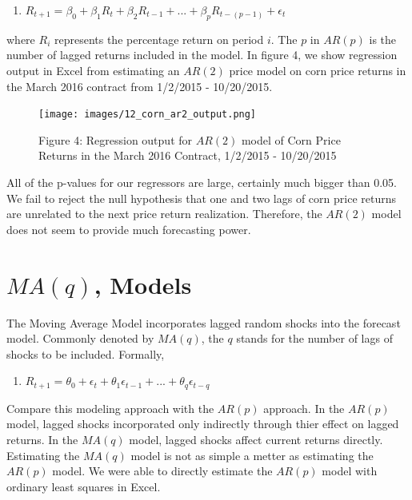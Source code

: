 \documentclass[
]{book}
\providecommand{\tightlist}{%
  \setlength{\itemsep}{0pt}\setlength{\parskip}{0pt}}
\begin{document}
\begin{enumerate}
\def\labelenumi{\arabic{enumi}.}
\tightlist
\item
  \(R_{t+1} = \beta_0 + \beta_1R_{t} + \beta_2R_{t-1}+ ... + \beta_{p}R_{t-(p-1)} + \epsilon_t\)
\end{enumerate}

where \(R_i\) represents the percentage return on period \(i\). The \(p\) in \(AR(p)\) is the number of lagged returns included in the model. In figure 4, we show regression output in Excel from estimating an \(AR(2)\) price model on corn price returns in the March 2016 contract from 1/2/2015 - 10/20/2015.

\begin{figure}
\centering
\texttt{[image: images/12\_corn\_ar2\_output.png]}
\caption{Figure 4: Regression output for \(AR(2)\) model of Corn Price Returns in the March 2016 Contract, 1/2/2015 - 10/20/2015}
\end{figure}

All of the p-values for our regressors are large, certainly much bigger than 0.05. We fail to reject the null hypothesis that one and two lags of corn price returns are unrelated to the next price return realization. Therefore, the \(AR(2)\) model does not seem to provide much forecasting power.

\hypertarget{maq-models}{%
\section{\texorpdfstring{\(MA(q)\), Models}{MA(q), Models}}\label{maq-models}}

The Moving Average Model incorporates lagged random shocks into the forecast model. Commonly denoted by \(MA(q)\), the \(q\) stands for the number of lags of shocks to be included. Formally,

\begin{enumerate}
\def\labelenumi{\arabic{enumi}.}
\setcounter{enumi}{1}
\tightlist
\item
  \(R_{t+1} = \theta_0 + \epsilon_t + \theta_1\epsilon_{t-1} + ... + \theta_q\epsilon_{t-q}\)
\end{enumerate}

Compare this modeling approach with the \(AR(p)\) approach. In the \(AR(p)\) model, lagged shocks incorporated only indirectly through thier effect on lagged returns. In the \(MA(q)\) model, lagged shocks affect current returns directly. Estimating the \(MA(q)\) model is not as simple a metter as estimating the \(AR(p)\) model. We were able to directly estimate the \(AR(p)\) model with ordinary least squares in Excel.
\end{document}
